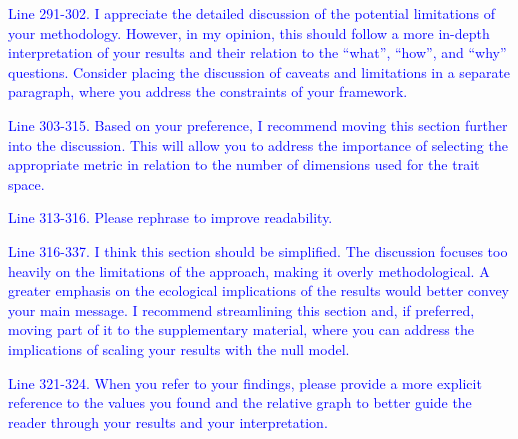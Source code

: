 \documentclass[
]{article}
\begin{document}
\textcolor{blue}{Line 291-302.
I appreciate the detailed discussion of the potential limitations of your methodology.
However, in my opinion, this should follow a more in-depth interpretation of your results and their relation to the ``what'', ``how'', and ``why'' questions.
Consider placing the discussion of caveats and limitations in a separate paragraph, where you address the constraints of your framework.}

\textcolor{blue}{Line 303-315.
Based on your preference, I recommend moving this section further into the discussion.
This will allow you to address the importance of selecting the appropriate metric in relation to the number of dimensions used for the trait space.}

\textcolor{blue}{Line 313-316. Please rephrase to improve readability.}

\textcolor{blue}{Line 316-337. I think this section should be simplified.
The discussion focuses too heavily on the limitations of the approach, making it overly methodological.
A greater emphasis on the ecological implications of the results would better convey your main message.
I recommend streamlining this section and, if preferred, moving part of it to the supplementary material, where you can address the implications of scaling your results with the null model.}

\textcolor{blue}{Line 321-324. When you refer to your findings, please provide a more explicit reference to the values you found and the relative graph to better guide the reader through your results and your interpretation.}
\end{document}
